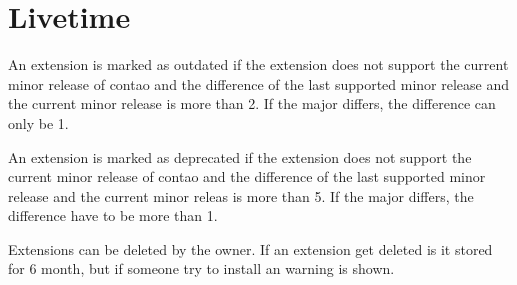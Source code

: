 \section[sec:livetime]{Livetime}

An extension is marked as outdated if the extension does not support the current minor release of contao and the difference of the last supported minor release and the current minor release is more than 2. If the major differs, the difference can only be 1.

An extension is marked as deprecated if the extension does not support the current minor release of contao and the difference of the last supported minor release and the current minor releas is more than 5. If the major differs, the difference have to be more than 1.

Extensions can be deleted by the owner. If an extension get deleted is it stored for 6 month, but if someone try to install an warning is shown.
